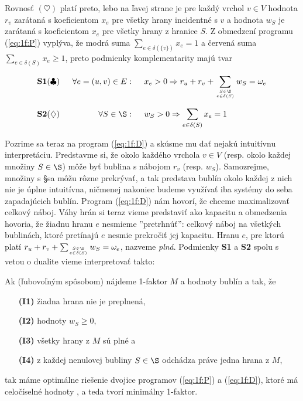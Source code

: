 \noindent
Rovnosť $(\heartsuit)$ platí preto, lebo na ľavej strane je
pre každý vrchol $v\in V$ hodnota $r_v$ zarátaná s koeficientom $x_e$
pre všetky hrany incidentné s $v$ a hodnota $w_S$ je zarátaná s koeficientom $x_e$ pre všetky hrany z hranice $S$.
Z obmedzení programu (\ref{eq:1f:P}) vyplýva, že modrá suma $\sum_{e\in\delta(\{v\})}x_e=1$ a
červená suma $\sum_{e\in\delta(S)}x_e\ge1$, preto podmienky komplementarity majú tvar

$$\begin{array}{lrl}
  {\bf S1} (\clubsuit) \;\;&\forall e=(u,v)\in E:\;\;&x_e>0\Rightarrow r_u + r_v +
  \displaystyle\sum\limits_{S\in\S\atop e\in\delta(S)}w_S=\omega_e\\[6ex]
  {\bf S2} (\diamondsuit)\;\;&\forall S\in\S:\;\; & w_S>0\Rightarrow \displaystyle\sum\limits_{e\in\delta(S)}x_e=1
\end{array}$$


\noindent
Pozrime sa teraz na program (\ref{eq:1f:D}) a skúsme mu dať nejakú intuitívnu interpretáciu.
Predstavme si, že okolo každého vrchola $v\in V$ (resp. okolo každej  množiny $S\in\S$) 
môže byť bublina s nábojom $r_v$ (resp. $w_S$). Samozrejme, množiny s \S sa môžu rôzne prekrývať,
a tak predstava bublín okolo každej z nich nie je úplne intuitívna, ničmenej nakoniec budeme
využívať iba systémy do seba zapadajúcich bublín. Program (\ref{eq:1f:D}) nám hovorí,
že chceme maximalizovať celkový náboj. Váhy hrán si teraz vieme predstaviť ako kapacitu a obmedzenia
hovoria, že žiadnu hranu $e$ nesmieme ''pretrhnúť'': celkový náboj na všetkých bublinách, ktoré pretínajú
$e$ nesmie prekročiť jej kapacitu. 
Hranu $e$, pre ktorú platí $ r_u + r_v + \sum_{S\in\S\atop e\in\delta(S)}w_S=\omega_e$, nazveme {\em plná}.
Podmienky {\bf S1} a {\bf S2} spolu s vetou o dualite vieme interpretovať takto:

\begin{lema}
  \label{lm:1f:opt}
  Ak (ľubovoľným spôsobom) nájdeme 1-faktor $M$ a hodnoty bublín  a  tak, že
  \begin{itemize}
    \item[{\bf (I1)}] žiadna hrana nie je preplnená,
    \item[{\bf (I2)}] hodnoty $w_S\ge 0$,
    \item[{\bf (I3)}] všetky hrany z $M$ sú plné  a
    \item[{\bf (I4)}]  z každej nenulovej bubliny $S\in\S$ odchádza práve jedna hrana z $M$,
\end{itemize}
  tak máme optimálne riešenie dvojice programov (\ref{eq:1f:P}) a (\ref{eq:1f:D}), ktoré má celočíselné
  hodnoty , a teda tvorí minimálny 1-faktor.
\end{lema}

